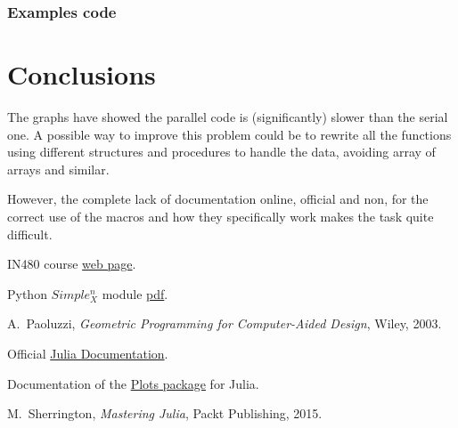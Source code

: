 \documentclass[a4paper,12pt,titlepage]{article}					%
\begin{document}
\subsubsection{Examples code}
\lipsum[6]


\section{Conclusions}
The graphs have showed the parallel code is (significantly) slower than the serial one.
A possible way to improve this problem could be to rewrite all the functions using different structures and procedures to handle the data, avoiding array of arrays and similar.

However, the complete lack of documentation online, official and non, for the correct use of the macros and how they specifically work makes the task quite difficult.


\clearpage												%
\thispagestyle{plain}										%

\begin{thebibliography}{9}

IN480 course \href{https://www.dia.uniroma3.it/~paoluzzi/web/did/calcoloparallelo/2018/}{web page}.

Python $Simple_{X}^{n}$ module \href{https://github.com/cvdlab/lar-cc/blob/master/doc/pdf/simplexn.pdf}{pdf}.

A.~Paoluzzi, \emph{Geometric Programming for Computer-Aided Design}, Wiley, 2003.

Official \href{https://docs.julialang.org/en/stable/}{Julia Documentation}.

Documentation of the \href{https://docs.juliaplots.org/latest/}{Plots package} for Julia.

M.~Sherrington, \emph{Mastering Julia}, Packt Publishing, 2015.

\end{thebibliography}
\end{document}
